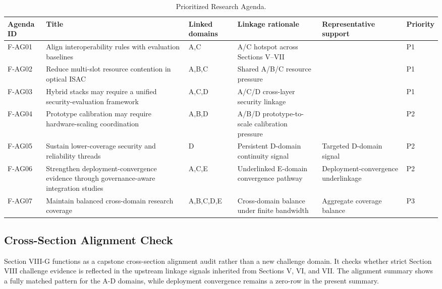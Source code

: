 \begin{table}[!t]
\caption{Prioritized Research Agenda.}
\label{tab:agenda}
\centering
\scriptsize
\begin{tabular}{p{} p{} p{} p{} p{} p{}}
\toprule
Agenda ID & Title & Linked domains & Linkage rationale & Representative support & Priority \\
\midrule
F-AG01 & Align interoperability rules with evaluation baselines & A,C & A/C hotspot across Sections V--VII & \cite{O_ISAC_133} & P1 \\
F-AG02 & Reduce multi-slot resource contention in optical ISAC & A,B,C & Shared A/B/C resource pressure & \cite{O_ISAC_049} & P1 \\
F-AG03 & Hybrid stacks may require a unified security-evaluation framework & A,C,D & A/C/D cross-layer security linkage & \cite{O_ISAC_156} & P1 \\
F-AG04 & Prototype calibration may require hardware-scaling coordination & A,B,D & A/B/D prototype-to-scale calibration pressure & \cite{O_ISAC_107} & P2 \\
F-AG05 & Sustain lower-coverage security and reliability threads & D & Persistent D-domain continuity signal & Targeted D-domain signal & P2 \\
F-AG06 & Strengthen deployment-convergence evidence through governance-aware integration studies & A,C,E & Underlinked E-domain convergence pathway & Deployment-convergence underlinkage & P2 \\
F-AG07 & Maintain balanced cross-domain research coverage & A,B,C,D,E & Cross-domain balance under finite bandwidth & Aggregate coverage balance & P3 \\
\bottomrule
\end{tabular}
\end{table}

\subsection{Cross-Section Alignment Check}

Section VIII-G functions as a capstone cross-section alignment audit rather than a new challenge domain. It checks whether strict Section VIII challenge evidence is reflected in the upstream linkage signals inherited from Sections V, VI, and VII. The alignment summary shows a fully matched pattern for the A-D domains, while deployment convergence remains a zero-row in the present summary.

